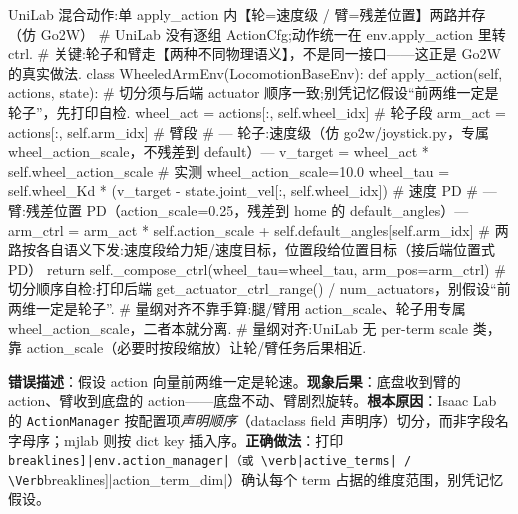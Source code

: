 \begin{codebox}[Python]{UniLab 混合动作:单 apply\_action 内【轮=速度级 / 臂=残差位置】两路并存（仿 Go2W）}
# UniLab 没有逐组 ActionCfg;动作统一在 env.apply_action 里转 ctrl.
# 关键:轮子和臂走【两种不同物理语义】，不是同一接口——这正是 Go2W 的真实做法.
class WheeledArmEnv(LocomotionBaseEnv):
    def apply_action(self, actions, state):
        # 切分须与后端 actuator 顺序一致;别凭记忆假设“前两维一定是轮子”，先打印自检.
        wheel_act = actions[:, self.wheel_idx]         # 轮子段
        arm_act   = actions[:, self.arm_idx]           # 臂段
        # --- 轮子:速度级（仿 go2w/joystick.py，专属 wheel_action_scale，不残差到 default）---
        v_target  = wheel_act * self.wheel_action_scale            # 实测 wheel_action_scale=10.0
        wheel_tau = self.wheel_Kd * (v_target - state.joint_vel[:, self.wheel_idx])  # 速度 PD
        # --- 臂:残差位置 PD（action_scale=0.25，残差到 home 的 default_angles）---
        arm_ctrl  = arm_act * self.action_scale + self.default_angles[self.arm_idx]
        # 两路按各自语义下发:速度段给力矩/速度目标，位置段给位置目标（接后端位置式 PD）
        return self._compose_ctrl(wheel_tau=wheel_tau, arm_pos=arm_ctrl)
# 切分顺序自检:打印后端 get_actuator_ctrl_range() / num_actuators，别假设“前两维一定是轮子”.
# 量纲对齐不靠手算:腿/臂用 action_scale、轮子用专属 wheel_action_scale，二者本就分离.
# 量纲对齐:UniLab 无 per-term scale 类，靠 action_scale（必要时按段缩放）让轮/臂任务后果相近.
\end{codebox}


\begin{pitfall}
\textbf{错误描述}：假设 action 向量前两维一定是轮速。\textbf{现象后果}：底盘收到臂的 action、臂收到底盘的 action——底盘不动、臂剧烈旋转。\textbf{根本原因}：Isaac Lab 的 \verb|ActionManager| 按配置项\emph{声明顺序}（dataclass field 声明序）切分，而非字段名字母序；mjlab 则按 dict key 插入序。\textbf{正确做法}：打印 \Verb[breaklines]|env.action_manager|（或 \verb|active_terms| / \Verb[breaklines]|action_term_dim|）确认每个 term 占据的维度范围，别凭记忆假设。
\end{pitfall}


